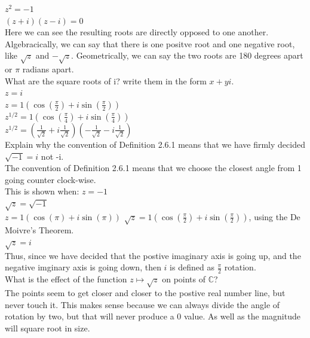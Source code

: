 \documentclass[12pt]{article}
\begin{document}
$z^2 = -1$\\
$(z + i)(z - i) = 0$\\

Here we can see the resulting roots are directly opposed to one another. 
Algebracically, we can say that there is one positve root and one negative root, like $\sqrt{z}$ and $-\sqrt{z}$.
Geometrically, we can say the two roots are 180 degrees apart or $\pi$ radians apart.\\



What are the square roots of i? write them in the form $x + yi$.\\

$z = i$\\
$z = 1(\cos(\frac{\pi}{2}) + i\sin(\frac{\pi}{2}))$\\
$z^{1/2} = 1(\cos(\frac{\pi}{4}) + i\sin(\frac{\pi}{4}))$\\
$z^{1/2} = (\frac{1}{\sqrt{2}} + i\frac{1}{\sqrt{2}})(-\frac{1}{\sqrt{2}} - i\frac{1}{\sqrt{2}})$\\


Explain why the convention of Definition 2.6.1 means that we have firmly decided $\sqrt{-1} = i$ not -i.\\

The convention of Definition 2.6.1 means that we choose the closest angle from 1 going counter clock-wise.\\

This is shown when: $z = -1$\\
$\sqrt{z} = \sqrt{-1}$\\
$z = 1(\cos(\pi) + i\sin(\pi))$
$\sqrt{z} = 1(\cos(\frac{\pi}{2}) + i\sin(\frac{\pi}{2}))$, using the De Moivre's Theorem.\\
$\sqrt{z} = i$\\

Thus, since we have decided that the postive imaginary axis is going up, and the negative imginary axis is going down, then $i$ is defined as $\frac{\pi}{2}$ rotation.\\



 What is the effect of the function $z \mapsto \sqrt{z}$ on points of $\mathbb{C}$?\\

The points seem to get closer and closer to the postive real number line, but never touch it.
This makes sense because we can always divide the angle of rotation by two, but that will never produce a 0 value.
As well as the magnitude will square root in size.\\
\end{document}
